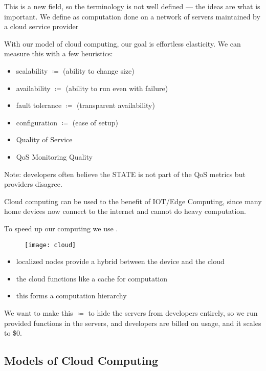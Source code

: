 \documentclass[../../lecture_notes.tex]{subfiles}
\begin{document}
This is a new field, so the terminology is not well defined — the ideas are what is important. We define  as computation done on a network of servers maintained by a cloud service provider

With our model of cloud computing, our goal is effortless elasticity. We can measure this with a few heuristics:
\begin{itemize}
	\item scalability $\coloneqq$ (ability to change size)
	\item availability $\coloneqq$ (ability to run even with failure)
	\item fault tolerance $\coloneqq$ (transparent availability)
	\item configuration $\coloneqq$ (ease of setup)
	\item Quality of Service
	\item QoS Monitoring Quality
\end{itemize}
Note: developers often believe the STATE is not part of the QoS metrics but providers disagree.

Cloud computing can be used to the benefit of IOT/Edge Computing, since many home devices now connect to the internet and cannot do heavy computation.

To speed up our computing we use .

\begin{figure}[h!]
	\centering
	\texttt{[image: cloud]}
\end{figure}

\begin{itemize}
\item localized nodes provide a hybrid between the device and the cloud
\item the cloud functions like a cache for computation
\item this forms a computation hierarchy
\end{itemize}

We want to make this  $\coloneqq$ to hide the servers from developers entirely, so we run provided functions in the servers, and developers are billed on usage, and it scales to \$0.

\subsection*{Models of Cloud Computing}
\end{document}
